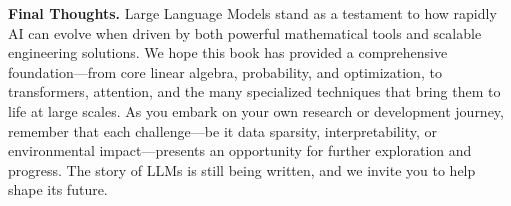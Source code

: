 \bigskip
\noindent
\textbf{Final Thoughts.} Large Language Models stand as a testament to how rapidly AI can evolve when driven by both powerful mathematical tools and scalable engineering solutions. We hope this book has provided a comprehensive foundation—from core linear algebra, probability, and optimization, to transformers, attention, and the many specialized techniques that bring them to life at large scales. As you embark on your own research or development journey, remember that each challenge—be it data sparsity, interpretability, or environmental impact—presents an opportunity for further exploration and progress. The story of LLMs is still being written, and we invite you to help shape its future. 
